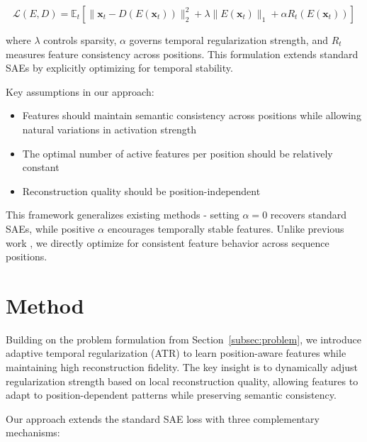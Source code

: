 \documentclass{article} %
\begin{document}
\begin{equation}
\mathcal{L}(E,D) = \mathbb{E}_{t}\left[\|\mathbf{x}_t - D(E(\mathbf{x}_t))\|_2^2 + \lambda\|E(\mathbf{x}_t)\|_1 + \alpha R_t(E(\mathbf{x}_t))\right]
\end{equation}

where $\lambda$ controls sparsity, $\alpha$ governs temporal regularization strength, and $R_t$ measures feature consistency across positions. This formulation extends standard SAEs by explicitly optimizing for temporal stability.

Key assumptions in our approach:
\begin{itemize}
    \item Features should maintain semantic consistency across positions while allowing natural variations in activation strength
    \item The optimal number of active features per position should be relatively constant
    \item Reconstruction quality should be position-independent
\end{itemize}

This framework generalizes existing methods - setting $\alpha=0$ recovers standard SAEs, while positive $\alpha$ encourages temporally stable features. Unlike previous work \cite{mudideEfficientDictionaryLearning2024a}, we directly optimize for consistent feature behavior across sequence positions.

\section{Method}
\label{sec:method}

Building on the problem formulation from Section~\ref{subsec:problem}, we introduce adaptive temporal regularization (ATR) to learn position-aware features while maintaining high reconstruction fidelity. The key insight is to dynamically adjust regularization strength based on local reconstruction quality, allowing features to adapt to position-dependent patterns while preserving semantic consistency.

Our approach extends the standard SAE loss with three complementary mechanisms:
\end{document}
